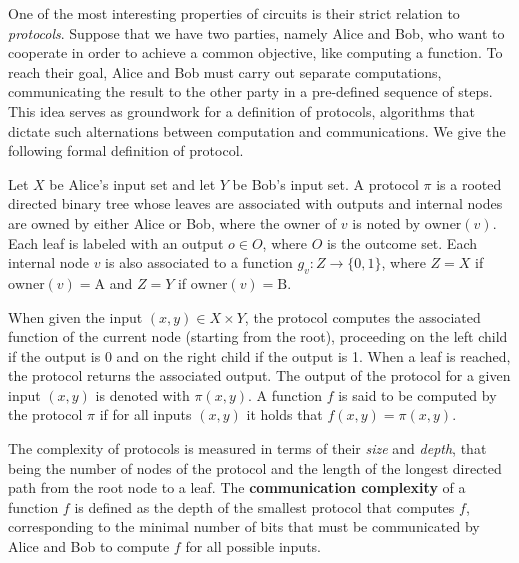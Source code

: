 One of the most interesting properties of circuits is their strict relation to \textit{protocols}. Suppose that we have two parties, namely Alice and Bob, who want to cooperate in order to achieve a common objective, like computing a function. To reach their goal, Alice and Bob must carry out separate computations, communicating the result to the other party in a pre-defined sequence of steps. This idea serves as groundwork for a definition of protocols, algorithms that dictate such alternations between computation and communications. We give the following formal definition of protocol. \cite{comm_compl_appl}

\begin{definition}
 Let $X$ be Alice's input set and let $Y$ be Bob's input set. A protocol $\pi$ is a rooted directed binary tree whose leaves are associated with outputs and internal nodes are owned by either Alice or Bob, where the owner of $v$ is noted by $\mathrm{owner}(v)$. Each leaf is labeled with an output $o \in O$, where $O$ is the outcome set. Each internal node $v$ is also associated to a function $g_v : Z \to \{0,1\}$, where $Z = X$ if $\mathrm{owner}(v) = \mathrm{A}$ and $Z = Y$ if $\mathrm{owner}(v) = \mathrm{B}$.
\end{definition}

When given the input $(x,y) \in X \times Y$, the protocol computes the associated function of the current node (starting from the root), proceeding on the left child if the output is 0 and on the right child if the output is 1. When a leaf is reached, the protocol returns the associated output. The output of the protocol for a given input $(x,y)$ is denoted with $\pi(x,y)$. A function $f$ is said to be computed by the protocol $\pi$ if for all inputs $(x,y)$ it holds that $f(x,y) = \pi(x,y)$.

The complexity of protocols is measured in terms of their \textit{size} and \textit{depth}, that being the number of nodes of the protocol and the length of the longest directed path from the root node to a leaf. The \textbf{communication complexity} of a function $f$ is defined as the depth of the smallest protocol that computes $f$, corresponding to the minimal number of bits that must be communicated by Alice and Bob to compute $f$ for all possible inputs.


